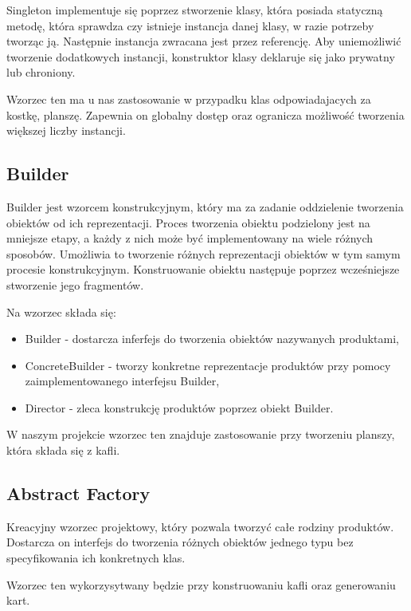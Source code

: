 \documentclass[a4paper, 11pt]{article}
\begin{document}
Singleton implementuje się poprzez stworzenie klasy, która posiada statyczną metodę, która sprawdza czy istnieje instancja danej klasy, w razie potrzeby tworząc ją. Następnie instancja zwracana jest przez referencję. Aby uniemożliwić tworzenie dodatkowych instancji, konstruktor klasy deklaruje się jako prywatny lub chroniony.

Wzorzec ten ma u nas zastosowanie w przypadku klas odpowiadajacych za kostkę, planszę. Zapewnia on globalny dostęp oraz ogranicza możliwość tworzenia większej liczby instancji. 

	\subsection{Builder}
	\indent
	
Builder jest wzorcem konstrukcyjnym, który ma za zadanie oddzielenie tworzenia obiektów od ich reprezentacji. 
Proces tworzenia obiektu podzielony jest na mniejsze etapy, a każdy z nich może być implementowany na wiele różnych sposobów. Umożliwia to tworzenie różnych reprezentacji obiektów w tym samym procesie konstrukcyjnym.
Konstruowanie obiektu następuje poprzez wcześniejsze stworzenie jego fragmentów.


Na wzorzec składa się:
\begin{itemize}

\item Builder - dostarcza inferfejs do tworzenia obiektów nazywanych produktami,
\item ConcreteBuilder - tworzy konkretne reprezentacje produktów przy pomocy zaimplementowanego interfejsu Builder,
\item Director - zleca konstrukcję produktów poprzez obiekt Builder.
\end{itemize}

W naszym projekcie wzorzec ten znajduje zastosowanie przy tworzeniu planszy, która składa się z kafli.


	\subsection{Abstract Factory}
\indent

Kreacyjny wzorzec projektowy, który pozwala tworzyć całe rodziny produktów. Dostarcza on interfejs do tworzenia różnych obiektów jednego typu bez specyfikowania ich konkretnych klas.

Wzorzec ten wykorzysytwany będzie przy konstruowaniu kafli oraz generowaniu kart.
\end{document}
